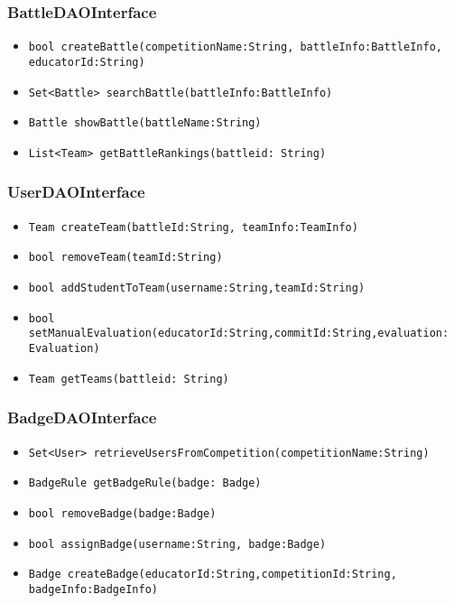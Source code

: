 \subsubsection{BattleDAOInterface}
\begin{itemize}
    \item \texttt{bool createBattle(competitionName:String, battleInfo:BattleInfo, educatorId:String)}
    \item \texttt{Set<Battle> searchBattle(battleInfo:BattleInfo)}
    \item \texttt{Battle showBattle(battleName:String)}
    \item \texttt{List<Team> getBattleRankings(battleid: String)}
\end{itemize}

\subsubsection{UserDAOInterface}
\begin{itemize}
    \item \texttt{Team createTeam(battleId:String, teamInfo:TeamInfo)}
    \item \texttt{bool removeTeam(teamId:String)}
    \item \texttt{bool addStudentToTeam(username:String,teamId:String)}
    \item \texttt{bool setManualEvaluation(educatorId:String,commitId:String,evaluation: Evaluation)}
    \item \texttt{Team getTeams(battleid: String)}
\end{itemize}

\subsubsection{BadgeDAOInterface}
\begin{itemize}
    \item \texttt{Set<User> retrieveUsersFromCompetition(competitionName:String)}
    \item \texttt{BadgeRule getBadgeRule(badge: Badge)}
    \item \texttt{bool removeBadge(badge:Badge)}
    \item \texttt{bool assignBadge(username:String, badge:Badge)}
    \item \texttt{Badge createBadge(educatorId:String,competitionId:String, badgeInfo:BadgeInfo)}
\end{itemize}

